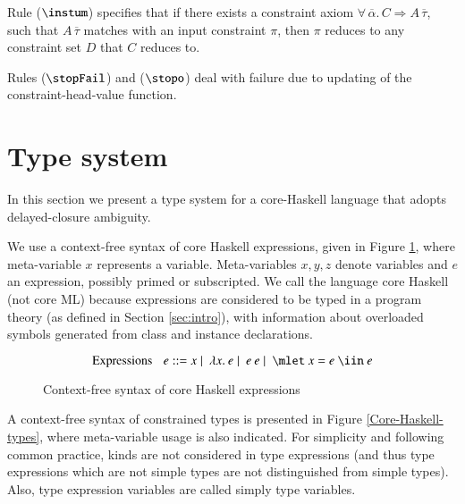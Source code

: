 \documentclass[review]{elsarticle}
\begin{document}
Rule ($\instum$) specifies that if there exists a constraint axiom
$\forall\,\overline{\alpha}.\,C \Rightarrow A\,\overline{\tau}$, such
that $A\,\overline{\tau}$ matches with an input constraint $\pi$, then
$\pi$ reduces to any constraint set $D$ that $C$ reduces to.

Rules ($\stopFail$) and ($\stopo$) deal with failure due to updating
of the constraint-head-value function.

\section{Type system}
\label{Type-system}

In this section we present a type system for a core-Haskell language
that adopts delayed-closure ambiguity.

We use a context-free syntax of core Has\-kell expressions, given in
Figure \ref{Core-Haskell-context-free-expressions}, where
meta-variable $x$ represents a variable. Meta-variables $x,y,z$ denote
variables and $e$ an expression, possibly primed or subscripted. We
call the language core Has\-kell (not core ML) because expressions are
considered to be typed in a program theory (as defined in Section
\ref{sec:intro}), with information about overloaded symbols generated
from class and instance declarations.

\begin{figure}
\[ \text{Expressions}\:\:\:\: e ::= x \mid\ \lambda x.\:e \mid\ e\: e
                                    \mid\ \mlet\ x=e\ \iin\ e
\]
\caption{Context-free syntax of core Haskell expressions}
\label{Core-Haskell-context-free-expressions}
\end{figure}

A context-free syntax of constrained types is presented in Figure
\ref{Core-Haskell-types}, where meta-variable usage is also
indicated. For simplicity and following common practice, kinds are not
considered in type expressions (and thus type expressions which are
not simple types are not distinguished from simple types). Also, type
expression variables are called simply type variables.
\end{document}
